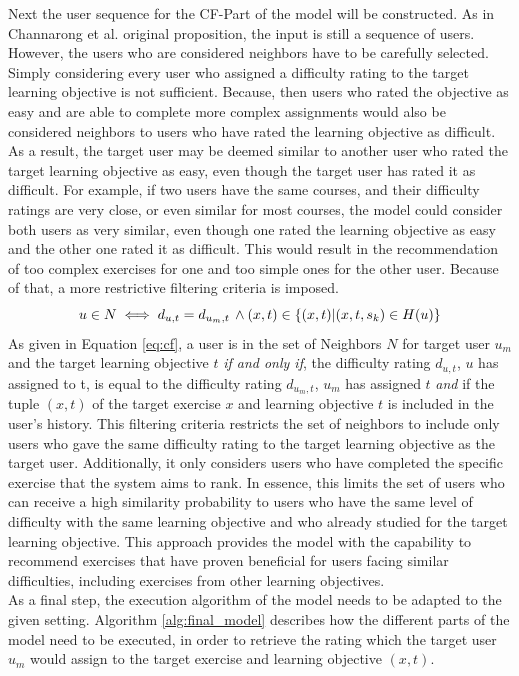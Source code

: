 \documentclass{Academic}
\begin{document}
        Next the user sequence for the CF-Part of the model will be constructed. As in Channarong et al. original proposition, the input is still a sequence of users. However, the users who are considered neighbors have to be carefully selected. Simply considering every user who assigned a difficulty rating to the target learning objective is not sufficient. Because, then users who rated the objective as easy and are able to complete more complex assignments would also be considered neighbors to users who have rated the learning objective as difficult. As a result, the target user may be deemed similar to another user who rated the target learning objective as easy, even though the target user has rated it as difficult. For example, if two users have the same courses, and their difficulty ratings are very close, or even similar for most courses, the model could consider both users as very similar, even though one rated the learning objective as easy and the other one rated it as difficult. This would result in the recommendation of too complex exercises for one and too simple ones for the other user. Because of that, a more restrictive filtering criteria is imposed.
        \begin{equation}\label{eq:cf}
            u \in N \iff d_{u, t} = d_{u_m, t} \text{\,} \wedge (x, t) \in \{(x,t)|(x,t,s_k) \in H(u)\}
        \end{equation}
        As given in Equation \ref{eq:cf}, a user is in the set of Neighbors $N$ for target user $u_m$ and the target learning objective $t$ \textit{if and only if}, the difficulty rating $d_{u,t}$, $u$ has assigned to t, is equal to the difficulty rating $d_{u_m, t}$, $u_m$ has assigned $t$ \textit{and} if the tuple $(x,t)$ of the target exercise $x$ and learning objective $t$ is included in the user's history. This filtering criteria restricts the set of neighbors to include only users who gave the same difficulty rating to the target learning objective as the target user. Additionally, it only considers users who have completed the specific exercise that the system aims to rank. In essence, this limits the set of users who can receive a high similarity probability to users who have the same level of difficulty with the same learning objective and who already studied for the target learning objective. This approach provides the model with the capability to recommend exercises that have proven beneficial for users facing similar difficulties, including exercises from other learning objectives.\\
        As a final step, the execution algorithm of the model needs to be adapted to the given setting. Algorithm \ref{alg:final_model} describes how the different parts of the model need to be executed, in order to retrieve the rating which the target user $u_m$ would assign to the target exercise and learning objective $(x,t)$.
\end{document}
